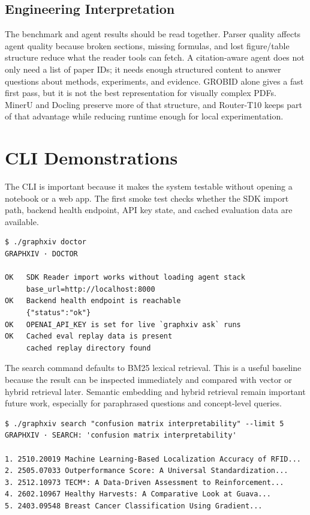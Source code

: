 \documentclass[10pt]{article}
\begin{document}
\subsection{Engineering Interpretation}

The benchmark and agent results should be read together. Parser quality affects agent quality because broken sections, missing formulas, and lost figure/table structure reduce what the reader tools can fetch. A citation-aware agent does not only need a list of paper IDs; it needs enough structured content to answer questions about methods, experiments, and evidence. GROBID alone gives a fast first pass, but it is not the best representation for visually complex PDFs. MinerU and Docling preserve more of that structure, and Router-T10 keeps part of that advantage while reducing runtime enough for local experimentation.

\section{CLI Demonstrations}

The CLI is important because it makes the system testable without opening a notebook or a web app. The first smoke test checks whether the SDK import path, backend health endpoint, API key state, and cached evaluation data are available.

\begin{lstlisting}[style=terminal,caption={Backend readiness check.}]
$ ./graphxiv doctor
GRAPHXIV · DOCTOR

OK   SDK Reader import works without loading agent stack
     base_url=http://localhost:8000
OK   Backend health endpoint is reachable
     {"status":"ok"}
OK   OPENAI_API_KEY is set for live `graphxiv ask` runs
OK   Cached eval replay data is present
     cached replay directory found
\end{lstlisting}

The search command defaults to BM25 lexical retrieval. This is a useful baseline because the result can be inspected immediately and compared with vector or hybrid retrieval later. Semantic embedding and hybrid retrieval remain important future work, especially for paraphrased questions and concept-level queries.


\begin{lstlisting}[style=terminal,caption={BM25 corpus search from the local backend.}]
$ ./graphxiv search "confusion matrix interpretability" --limit 5
GRAPHXIV · SEARCH: 'confusion matrix interpretability'

1. 2510.20019 Machine Learning-Based Localization Accuracy of RFID...
2. 2505.07033 Outperformance Score: A Universal Standardization...
3. 2512.10973 TECM*: A Data-Driven Assessment to Reinforcement...
4. 2602.10967 Healthy Harvests: A Comparative Look at Guava...
5. 2403.09548 Breast Cancer Classification Using Gradient...
\end{lstlisting}
\end{document}
